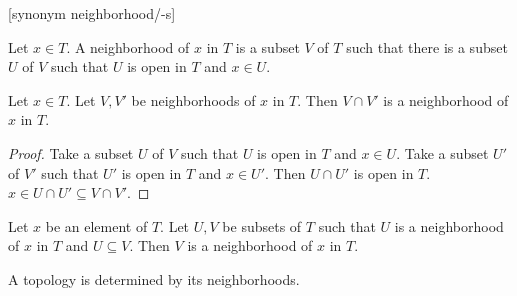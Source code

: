 \documentclass[english,11pt]{article}
\begin{document}
\begin{forthel}

[synonym neighborhood/-s]

\begin{definition} Let $x \in T$. A neighborhood of $x$ in $T$
is a subset $V$ of $T$ such that there is a subset $U$ of $V$  
such that $U$ is open in $T$ and $x \in U$.
\end{definition}

\begin{lemma} Let $x \in T$. Let $V,V'$ be neighborhoods of $x$ in $T$.
Then $V \cap V'$ is a neighborhood of $x$ in $T$.
\end{lemma}
\begin{proof} Take a subset $U$ of $V$ such that $U$ is open
in $T$ and $x \in U$.
Take a subset $U'$ of $V'$ such that $U'$ is open
in $T$ and $x \in U'$.
Then $U \cap U'$ is open in $T$.
$x \in U \cap U' \subseteq V \cap V'$.
\end{proof}

\begin{lemma}
Let $x$ be an element of $T$. Let $U,V$ be subsets of $T$
such that $U$ is a neighborhood of
$x$ in $T$ and $U \subseteq V$.
Then $V$ is a neighborhood of $x$ in $T$.
\end{lemma}

\end{forthel}
A topology is determined by its neighborhoods.
\end{document}
